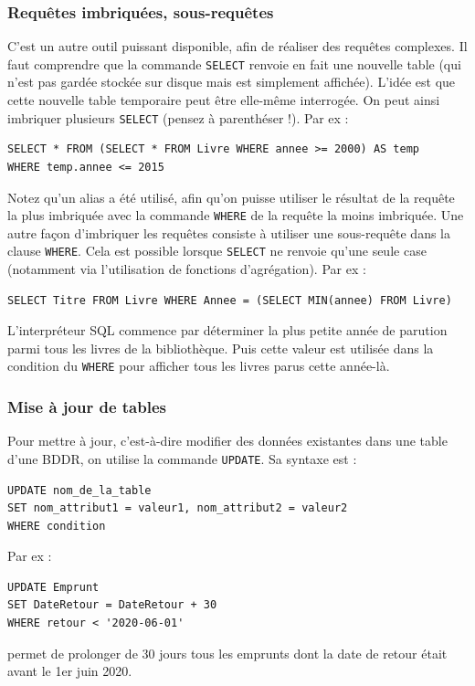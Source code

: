 \documentclass[11pt,a4paper,french,twoside]{PMCours}
\begin{document}
\subsubsection*{Requêtes imbriquées, sous-requêtes}

C'est un autre outil puissant disponible, afin de réaliser des requêtes complexes. Il faut comprendre que la commande \verb'SELECT' renvoie en fait une nouvelle table (qui n'est pas gardée stockée sur disque mais est simplement affichée). L'idée est que cette nouvelle table temporaire peut être elle-même interrogée. On peut ainsi imbriquer plusieurs \verb'SELECT' (pensez à parenthéser !). Par ex :
\begin{verbatim}
SELECT * FROM (SELECT * FROM Livre WHERE annee >= 2000) AS temp
WHERE temp.annee <= 2015
\end{verbatim}
Notez qu'un alias a été utilisé, afin qu'on puisse utiliser le résultat de la requête la plus imbriquée avec la commande \verb'WHERE' de la requête la moins imbriquée. Une autre façon d'imbriquer les requêtes consiste à utiliser une sous-requête dans la clause \verb'WHERE'. Cela est possible lorsque \verb'SELECT' ne renvoie qu'une seule case (notamment via l'utilisation de fonctions d'agrégation). Par ex : 
\begin{verbatim}
SELECT Titre FROM Livre WHERE Annee = (SELECT MIN(annee) FROM Livre)
\end{verbatim}
L'interpréteur SQL commence par déterminer la plus petite année de parution parmi tous les livres de la bibliothèque. Puis cette valeur est utilisée dans la condition du \verb'WHERE' pour afficher tous les livres parus cette année-là.


\subsubsection*{Mise à jour de tables}

Pour mettre à jour, c'est-à-dire modifier des données existantes dans une table d'une BDDR, on utilise la commande \verb'UPDATE'. Sa syntaxe est :
\begin{verbatim}
UPDATE nom_de_la_table 
SET nom_attribut1 = valeur1, nom_attribut2 = valeur2 
WHERE condition
\end{verbatim}
Par ex :
\begin{verbatim}
UPDATE Emprunt 
SET DateRetour = DateRetour + 30
WHERE retour < '2020-06-01'
\end{verbatim}
permet de prolonger de 30 jours tous les emprunts dont la date de retour était avant le 1er juin 2020.
\end{document}

